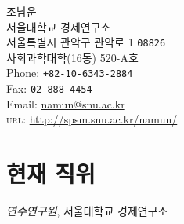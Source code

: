 \documentclass[11pt, a4paper]{article} %
\begin{document}

{\LARGE 조남운}\\[1cm] %
서울대학교 경제연구소\\ %
서울특별시 관악구 관악로 1 \texttt{08826}\\
사회과학대학(16동) 520-A호
\\[.2cm]
Phone: \texttt{+82-10-6343-2884}\\ %
Fax: \texttt{02-888-4454}\\[.2cm] %
Email: \href{mailto:namun@snu.ac.kr}{namun@snu.ac.kr}\\ %
\textsc{url}: \href{http://spsm.snu.ac.kr/namun/}{http://spsm.snu.ac.kr/namun/}\\ %






\section*{현재 직위}

\emph{연수연구원}, 서울대학교 경제연구소
\end{document}
